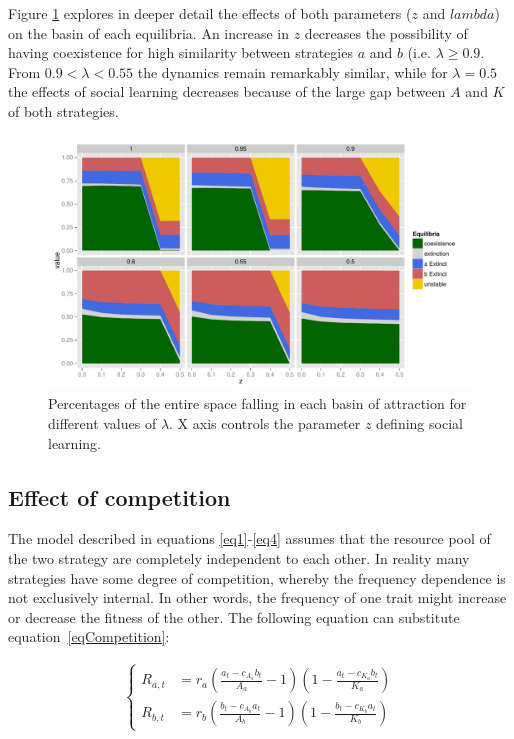 \documentclass[preprint,authoryear]{elsarticle}
\begin{document}
Figure \ref{fig:percentages} explores in deeper detail the effects of both parameters ($z$ and $lambda$) on the basin of each equilibria. An increase in $z$ decreases the possibility of having coexistence for high similarity between strategies $a$ and $b$ (i.e. $\lambda \geq 0.9$. From $0.9 < \lambda < 0.55$ the dynamics remain remarkably similar, while for $\lambda = 0.5$ the effects of social learning decreases because of the large gap between $A$ and $K$ of both strategies.

\begin{figure}[h!]
  \centering
      \includegraphics[width=\textwidth]{./figures/figure6}
  \caption{Percentages of the entire space falling in each basin of attraction for different values of $\lambda$. X axis controls the parameter $z$ defining social learning.}
    \label{fig:percentages}
\end{figure}


\subsection{Effect of competition}

The model described in equations \ref{eq1}-\ref{eq4} assumes that the resource pool of the two strategy are completely independent to each other. In reality many strategies have some degree of competition, whereby the frequency dependence is not exclusively internal. In other words, the frequency of one trait might increase or decrease the fitness of the other. The following equation can substitute equation~\eqref{eqCompetition}: 

\begin{align}
\begin{cases}
R_{a,t}& = r_a (\frac{a_t-c_{A_a}b_t}{A_a}-1)(1-\frac{a_t-c_{K_a}b_t}{K_a})\\
R_{b,t}& = r_b (\frac{b_t-c_{A_b}a_t}{A_b}-1)(1-\frac{b_t-c_{K_b}a_t}{K_b}) 
\end{cases}
\label{eqCompetition}
\end{align}
\end{document}
